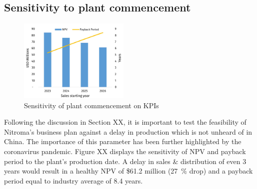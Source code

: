 \subsection{Sensitivity to plant commencement}
\begin{figure}
    \vspace{-1.1cm}
    \caption{Sensitivity of plant commencement on KPIs}
    \label{Sensitivity_ProductionDelay}
    \includegraphics[width=0.47\textwidth]{chapters/6-economics/figures/Sensitivity_ProductionDelay.jpg}
\end{figure}
Following the discussion in Section XX, it is important to test the feasibility of Nitroma’s business plan against a delay in production which is not unheard of in China. The importance of this parameter has been further highlighted by the coronavirus pandemic. Figure XX displays the sensitivity of NPV and payback period to the plant’s production date. A delay in sales \& distribution of even 3 years would result in a healthy NPV of \$61.2 million (\SI{27}{\percent} drop) and a payback period equal to industry average of 8.4 years. 


